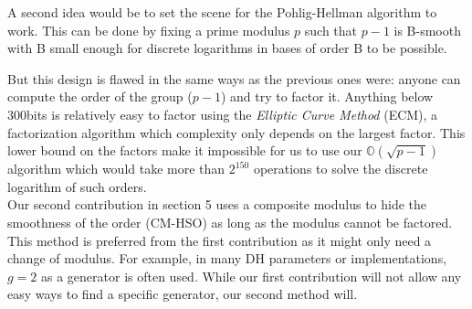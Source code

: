 \documentclass[a4paper,11pt,twocolumn]{article}
\begin{document}
A second idea would be to set the scene for the Pohlig-Hellman algorithm to work. This can be done by fixing a prime modulus $p$ such that $p-1$ is B-smooth  with B small enough for discrete logarithms in bases of order B to be possible.\\

\begin{center}
\end{center}

But this design is flawed in the same ways as the previous ones were: anyone can compute the order of the group ($p - 1$) and try to factor it. Anything below 300bits is relatively easy to factor using the \emph{Elliptic Curve Method} (ECM), a factorization algorithm which complexity only depends on the largest factor. This lower bound on the factors make it impossible for us to use our $\mathbb{O}(\sqrt{p-1})$ algorithm which would take more than $2^{150}$ operations to solve the discrete logarithm of such orders. \\

Our second contribution in section 5 uses a composite modulus to hide the smoothness of the order (CM-HSO) as long as the modulus cannot be factored. This method is preferred from the first contribution as it might only need a change of modulus. For example, in many DH parameters or implementations, $g=2$ as a generator is often used. While our first contribution will not allow any easy ways to find a specific generator, our second method will.
\end{document}
